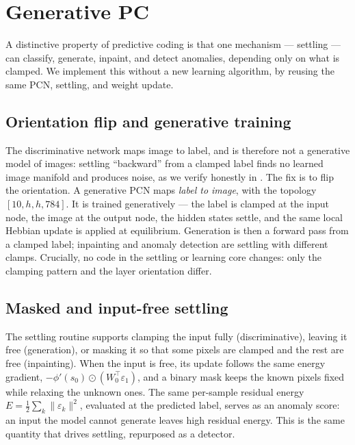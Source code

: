 \section{Generative PC}\label{sec:method-generative}

A distinctive property of predictive coding is that one mechanism --- settling --- can classify,
generate, inpaint, and detect anomalies, depending only on what is clamped. We implement this without a
new learning algorithm, by reusing the same PCN, settling, and weight update.

\subsection{Orientation flip and generative training}

The discriminative network maps image to label, and is therefore not a generative model of images:
settling ``backward'' from a clamped label finds no learned image manifold and produces noise, as we
verify honestly in . The fix is to flip the orientation. A generative PCN maps
\emph{label to image}, with the topology $[10, h, h, 784]$. It is trained generatively --- the label is
clamped at the input node, the image at the output node, the hidden states settle, and the same local
Hebbian update is applied at equilibrium. Generation is then a forward pass from a clamped label;
inpainting and anomaly detection are settling with different clamps. Crucially, no code in the settling
or learning core changes: only the clamping pattern and the layer orientation differ.

\subsection{Masked and input-free settling}

The settling routine supports clamping the input fully (discriminative), leaving it free (generation),
or masking it so that some pixels are clamped and the rest are free (inpainting). When the input is
free, its update follows the same energy gradient, $-\phi'(s_0)\odot(W_0^{\!\top}\varepsilon_1)$, and a
binary mask keeps the known pixels fixed while relaxing the unknown ones. The same per-sample residual
energy $E = \tfrac12\sum_k\lVert\varepsilon_k\rVert^2$, evaluated at the predicted label, serves as an
anomaly score: an input the model cannot generate leaves high residual energy. This is the same
quantity that drives settling, repurposed as a detector.

